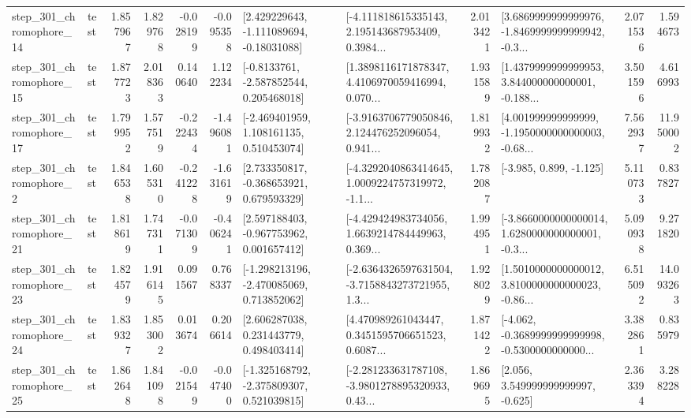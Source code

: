 \begin{tabular}{llrrrrllrlrr}
  step\_301\_chromophore\_14 &      test &      1.857967 &    1.829768 &     -0.028199 & -0.095358 &    [2.429229643, -1.111089694, -0.18031088] &  [-4.111818615335143, 2.195143687953409, 0.3984... &       2.013421 &  [3.6869999999999976, -1.8469999999999942, -0.3... &            2.071536 &          1.594673 \\
  step\_301\_chromophore\_15 &      test &      1.877723 &    2.018363 &      0.140640 &  1.122234 &     [-0.8133761, -2.587852544, 0.205468018] &  [1.3898116171878347, 4.4106970059416994, 0.070... &       1.931589 &  [1.4379999999999953, 3.844000000000001, -0.188... &            3.501596 &          4.616993 \\
  step\_301\_chromophore\_17 &      test &      1.799952 &    1.577519 &     -0.222434 & -1.496081 &    [-2.469401959, 1.108161135, 0.510453074] &  [-3.9163706779050846, 2.124476252096054, 0.941... &       1.819932 &  [4.001999999999999, -1.1950000000000003, -0.68... &            7.562937 &         11.950002 \\
   step\_301\_chromophore\_2 &      test &      1.846538 &    1.605310 &     -0.241228 & -1.631619 &    [2.733350817, -0.368653921, 0.679593329] &  [-4.3292040863414645, 1.0009224757319972, -1.1... &       1.782087 &                            [-3.985, 0.899, -1.125] &            5.110733 &          0.837827 \\
  step\_301\_chromophore\_21 &      test &      1.818619 &    1.747311 &     -0.071309 & -0.406241 &    [2.597188403, -0.967753962, 0.001657412] &  [-4.429424983734056, 1.6639214784449963, 0.369... &       1.994951 &  [-3.8660000000000014, 1.6280000000000001, -0.3... &            5.090938 &          9.271820 \\
  step\_301\_chromophore\_23 &      test &      1.824579 &    1.916145 &      0.091567 &  0.768337 &   [-1.298213196, -2.470085069, 0.713852062] &  [-2.6364326597631504, -3.7158843273721955, 1.3... &       1.928029 &  [1.5010000000000012, 3.8100000000000023, -0.86... &            6.515092 &         14.093263 \\
  step\_301\_chromophore\_24 &      test &      1.839327 &    1.853002 &      0.013674 &  0.206614 &     [2.606287038, 0.231443779, 0.498403414] &  [4.470989261043447, 0.3451595706651523, 0.6087... &       1.871422 &  [-4.062, -0.3689999999999998, -0.5300000000000... &            3.382861 &          0.835979 \\
  step\_301\_chromophore\_25 &      test &      1.862648 &    1.841098 &     -0.021549 & -0.047400 &   [-1.325168792, -2.375809307, 0.521039815] &  [-2.281233631787108, -3.9801278895320933, 0.43... &       1.869695 &                 [2.056, 3.549999999999997, -0.625] &            2.363394 &          3.288228 \\

\end{tabular}
